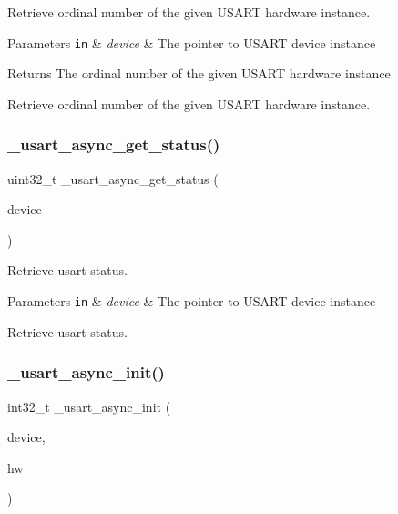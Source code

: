Retrieve ordinal number of the given U\+S\+A\+RT hardware instance. 


\begin{DoxyParams}[1]{Parameters}
\mbox{\tt in}  & {\em device} & The pointer to U\+S\+A\+RT device instance\\
\hline
\end{DoxyParams}
\begin{DoxyReturn}{Returns}
The ordinal number of the given U\+S\+A\+RT hardware instance
\end{DoxyReturn}
Retrieve ordinal number of the given U\+S\+A\+RT hardware instance. \mbox{\label{group___h_p_l_ga09d708dc23dacf358d3de8a3a0545c1a}} 
\subsubsection{\texorpdfstring{\+\_\+usart\+\_\+async\+\_\+get\+\_\+status()}{\_usart\_async\_get\_status()}}
{\footnotesize\ttfamily uint32\+\_\+t \+\_\+usart\+\_\+async\+\_\+get\+\_\+status (\begin{DoxyParamCaption}\item[{const struct \hyperlink{struct__usart__async__device}{\+\_\+usart\+\_\+async\+\_\+device} $\ast$const}]{device }\end{DoxyParamCaption})}



Retrieve usart status. 


\begin{DoxyParams}[1]{Parameters}
\mbox{\tt in}  & {\em device} & The pointer to U\+S\+A\+RT device instance\\
\hline
\end{DoxyParams}
Retrieve usart status. \mbox{\label{group___h_p_l_ga11745e0bd0c9d636afbefae8e209665e}} 
\subsubsection{\texorpdfstring{\+\_\+usart\+\_\+async\+\_\+init()}{\_usart\_async\_init()}}
{\footnotesize\ttfamily int32\+\_\+t \+\_\+usart\+\_\+async\+\_\+init (\begin{DoxyParamCaption}\item[{struct \hyperlink{struct__usart__async__device}{\+\_\+usart\+\_\+async\+\_\+device} $\ast$const}]{device,  }\item[{void $\ast$const}]{hw }\end{DoxyParamCaption})}



